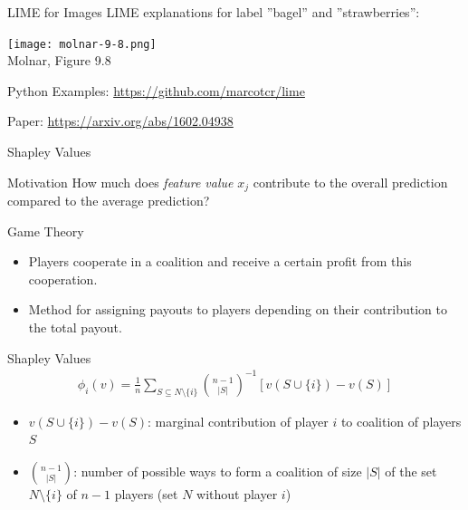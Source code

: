 \documentclass[ignorenonframetext,xcolor=x11names]{beamer}
\begin{document}

        

\begin{frame}{LIME for Images}
LIME explanations for label ''bagel'' and ''strawberries'':
\begin{center}
\texttt{[image: molnar-9-8.png]} \\

\scriptsize Molnar, Figure 9.8
\end{center}
\begin{block}{Python Examples:}
\url{https://github.com/marcotcr/lime}
\end{block}

\begin{block}{Paper:}
\url{https://arxiv.org/abs/1602.04938}
\end{block}
\end{frame}


\begin{frame}{Shapley Values}
\begin{block}{Motivation}
How much does \emph{feature value} $x_j$ contribute to the overall prediction compared to the average prediction?
\end{block}

\begin{block}{Game Theory}
\begin{itemize}
\item Players cooperate in a coalition and receive a certain profit from this cooperation.
\item Method for assigning payouts to players depending on their contribution to the total payout. 
\end{itemize}
\end{block}

\end{frame}

\begin{frame}{Shapley Values}
\begin{align*}
\phi_i(v) = \frac{1}{n} \sum_{S \subseteq N \setminus \{i\}} \binom{n-1}{|S|}^{-1} \left[ v(S \cup \{i\}) - v(S)\right]
\end{align*}

\begin{itemize}
\item $v(S \cup \{i\}) - v(S)$: marginal contribution of player $i$ to coalition of players $S$
\item $\binom{n-1}{|S|}$: number of possible ways to form a coalition of size $|S|$ of the set $N \setminus \{i\}$ of $n-1$ players (set $N$ without player $i$)
\end{itemize}
\end{frame}
\end{document}
